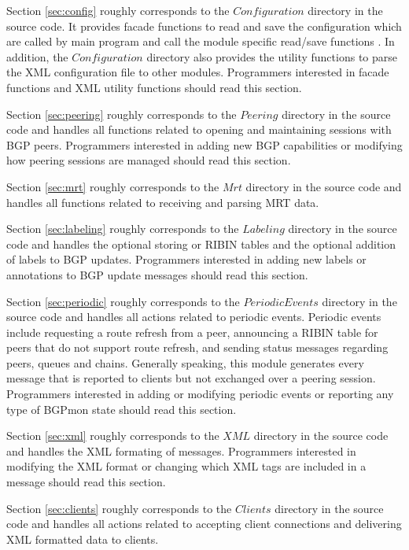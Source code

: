 Section \ref{sec:config} roughly corresponds to the $Configuration$ directory in the source code. It provides facade functions to read and save the configuration which are called by main program and call the module specific read/save functions .  In addition, the $Configuration$ directory also provides the utility functions to parse the XML configuration file to other modules. Programmers interested in facade functions and XML utility functions should read this section.   

Section \ref{sec:peering} roughly corresponds to the $Peering$ directory in the source code and handles all functions related to opening and maintaining sessions with BGP peers.   Programmers interested in adding new BGP capabilities or modifying how peering sessions are managed should read this section. 

Section \ref{sec:mrt} roughly corresponds to the $Mrt$ directory in the source code and handles all functions related to receiving and parsing MRT data. 

Section \ref{sec:labeling} roughly corresponds to the $Labeling$ directory in the source code and handles the optional storing or RIBIN tables and the optional addition of labels to BGP updates.   Programmers interested in adding new labels or annotations to BGP update messages should read this section.

Section \ref{sec:periodic} roughly corresponds to the $PeriodicEvents$ directory in the source code and handles all actions related to periodic events.    Periodic events include requesting a route refresh from a peer,   announcing a RIBIN table for peers that do not support route refresh, and sending status messages regarding peers, queues and chains.    Generally speaking, this module generates every message that is reported to clients but not exchanged over a peering session.   Programmers interested in adding or modifying periodic events or reporting any type of BGPmon state should read this section.

Section \ref{sec:xml} roughly corresponds to the $XML$ directory in the source code and handles the XML formating of messages.   Programmers interested in modifying the XML format or changing which XML tags are included in a message should read this section.

Section \ref{sec:clients} roughly corresponds to the $Clients$ directory in the source code and handles all actions related to accepting client connections and delivering XML formatted data to clients.

